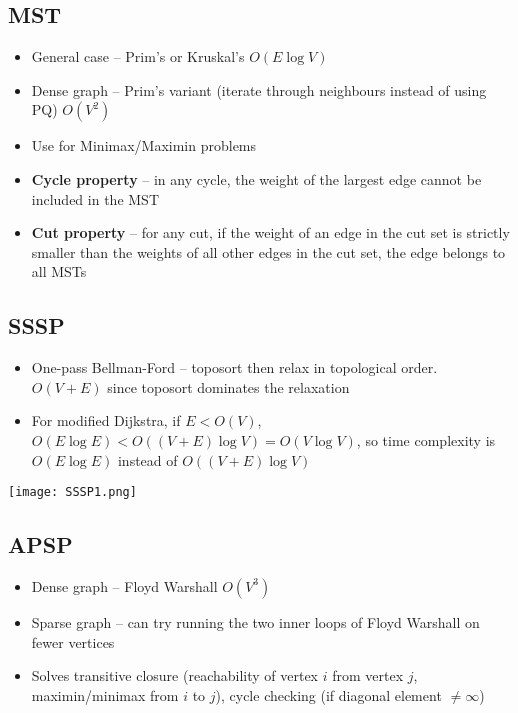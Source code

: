 \documentclass[frenchspacing,12pt,a4paper]{article}
\theoremstyle{remark}
\begin{document}
\subsection{MST}
\begin{itemize}
	\item General case -- Prim's or Kruskal's $O(E\log V)$
	\item Dense graph -- Prim's variant (iterate through neighbours instead of using PQ) $O(V^2)$
	\item Use for Minimax/Maximin problems
	\item \textbf{Cycle property} -- in any cycle, the weight of the largest edge cannot be included in the MST
	\item \textbf{Cut property} -- for any cut, if the weight of an edge in the cut set is strictly smaller than the weights of all other edges in the cut set, the edge belongs to all MSTs
\end{itemize}
\subsection{SSSP}
\begin{itemize}
	\item One-pass Bellman-Ford -- toposort then relax in topological order. $O(V+E)$ since toposort dominates the relaxation
	\item For modified Dijkstra, if  $E<O(V)$,  $O(E\log E)<O((V+E)\log V)=O(V\log V)$, so time complexity is  $O(E\log E)$ instead of  $O((V+E)\log V)$
\end{itemize}
\begin{center}
\texttt{[image: SSSP1.png]}	
\end{center}
\subsection{APSP}
\begin{itemize}
	\item Dense graph -- Floyd Warshall $O(V^3)$
	\item Sparse graph -- can try running the two inner loops of Floyd Warshall on fewer vertices
	\item Solves transitive closure (reachability of vertex $i$ from vertex $j$, maximin/minimax from  $i$ to  $j$), cycle checking (if diagonal element $\neq\infty$)
\end{itemize}
\end{document}
